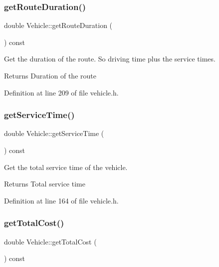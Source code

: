 \subsubsection{\texorpdfstring{get\+Route\+Duration()}{getRouteDuration()}}
{\footnotesize\ttfamily double Vehicle\+::get\+Route\+Duration (\begin{DoxyParamCaption}{ }\end{DoxyParamCaption}) const\hspace{0.3cm}{\ttfamily [inline]}}

Get the duration of the route. So driving time plus the service times. \begin{DoxyReturn}{Returns}
Duration of the route 
\end{DoxyReturn}


Definition at line 209 of file vehicle.\+h.

\mbox{\label{class_vehicle_ac3f306380304c8f87e741f96ee35c563}} 
\subsubsection{\texorpdfstring{get\+Service\+Time()}{getServiceTime()}}
{\footnotesize\ttfamily double Vehicle\+::get\+Service\+Time (\begin{DoxyParamCaption}{ }\end{DoxyParamCaption}) const\hspace{0.3cm}{\ttfamily [inline]}}

Get the total service time of the vehicle. \begin{DoxyReturn}{Returns}
Total service time 
\end{DoxyReturn}


Definition at line 164 of file vehicle.\+h.

\mbox{\label{class_vehicle_a83d25c44fc48f4affd6d83bab54f98f0}} 
\subsubsection{\texorpdfstring{get\+Total\+Cost()}{getTotalCost()}}
{\footnotesize\ttfamily double Vehicle\+::get\+Total\+Cost (\begin{DoxyParamCaption}{ }\end{DoxyParamCaption}) const\hspace{0.3cm}{\ttfamily [inline]}}


